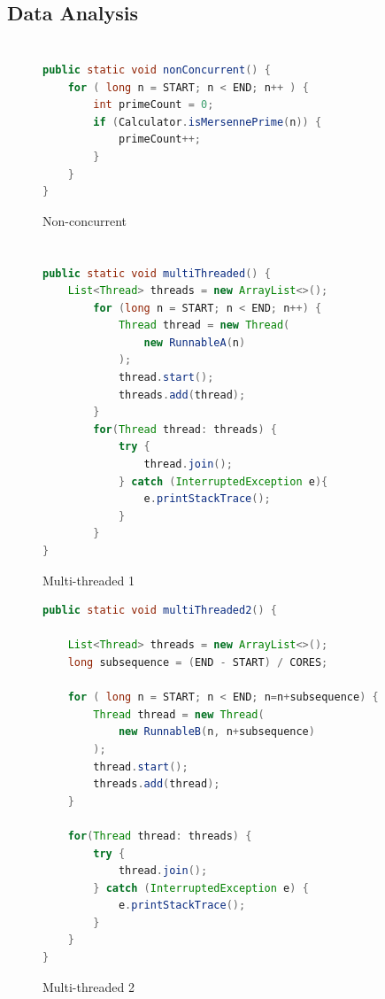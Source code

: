 \documentclass[]{report}
\begin{document}
\section{Data Analysis}

\appendix
\chapter{}
\begin{figure}[h!]
	\caption{Non-concurrent}
	\begin{lstlisting}[language=Java,frame=single]
public static void nonConcurrent() {
	for ( long n = START; n < END; n++ ) {
		int primeCount = 0;
		if (Calculator.isMersennePrime(n)) {
			primeCount++;
		}
	}
}
	\end{lstlisting}
\end{figure}

\chapter{}
\begin{figure}[h!]
	\caption{Multi-threaded 1}
	\begin{lstlisting}[language=Java,frame=single]
public static void multiThreaded() {
	List<Thread> threads = new ArrayList<>();
		for (long n = START; n < END; n++) {
			Thread thread = new Thread(
				new RunnableA(n)
			);
			thread.start();
			threads.add(thread);
		}
		for(Thread thread: threads) {
			try {
				thread.join();
			} catch (InterruptedException e){
				e.printStackTrace();
			}
		}
}
	\end{lstlisting}
\end{figure}

\begin{figure}[h!]
	\caption{Multi-threaded 2}
	\begin{lstlisting}[language=Java,frame=single]
public static void multiThreaded2() {

	List<Thread> threads = new ArrayList<>();
	long subsequence = (END - START) / CORES;
	
	for ( long n = START; n < END; n=n+subsequence) {
		Thread thread = new Thread(
			new RunnableB(n, n+subsequence)
		);
		thread.start();
		threads.add(thread);
	}
	
	for(Thread thread: threads) {
		try {
			thread.join();
		} catch (InterruptedException e) {
			e.printStackTrace();
		}
	}
}
	\end{lstlisting}
\end{figure}
\end{document}
